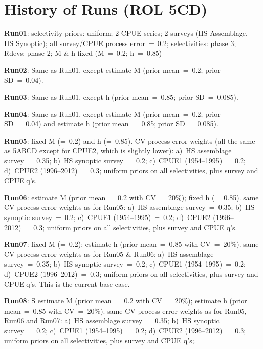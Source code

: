 
\section*{History of Runs (ROL 5CD)}

{\bf Run01}: selectivity priors: uniform; 2 CPUE series; 2 surveys (HS Assemblage, HS Synoptic); all survey/CPUE process error~=~0.2; selectivities: phase 3; Rdevs: phase 2; M \& h fixed (M~=~0.2; h~=~0.85) \newline  

{\bf Run02}: Same as Run01, except estimate M (prior mean~=~0.2; prior SD~=~0.04). \newline

{\bf Run03}: Same as Run01, except h (prior mean~=~0.85; prior SD~=~0.085). \newline

{\bf Run04}: Same as Run01,  except estimate M (prior mean~=~0.2; prior SD~=~0.04) and estimate h (prior mean~=~0.85; prior SD~=~0.085). \newline

{\bf Run05}: fixed M (=~0.2) and h (=~0.85).  CV process error weights (all the same as 5ABCD except for CPUE2, which is slightly lower): a)~HS assemblage survey~=~0.35; b)~HS synoptic survey~=~0.2; c)~CPUE1 (1954--1995)~=~0.2; d)~CPUE2 (1996--2012)~=~0.3; uniform priors on all selectivities, plus survey and CPUE q's. \newline

{\bf Run06}: estimate M (prior mean~=~0.2 with CV~=~20\%); fixed h (=~0.85).  same CV process error weights as for Run05: a)~HS assemblage survey~=~0.35; b)~HS synoptic survey~=~0.2; c)~CPUE1 (1954--1995)~=~0.2; d)~CPUE2 (1996--2012)~=~0.3; uniform priors on all selectivities, plus survey and CPUE q's. \newline

{\bf Run07}: fixed M (=~0.2); estimate h (prior mean~=~0.85 with CV~=~20\%).  same CV process error weights as for Run05 \& Run06: a)~HS assemblage survey~=~0.35; b)~HS synoptic survey~=~0.2; c)~CPUE1 (1954--1995)~=~0.2; d)~CPUE2 (1996--2012)~=~0.3; uniform priors on all selectivities, plus survey and CPUE q's.  This is the current base case. \newline

{\bf Run08}: S estimate M (prior mean~=~0.2 with CV~=~20\%); estimate h (prior mean~=~0.85 with CV~=~20\%).  same CV process error weights as for Run05, Run06 and Run07: a)~HS assemblage survey~=~0.35; b)~HS synoptic survey~=~0.2; c)~CPUE1 (1954--1995)~=~0.2; d)~CPUE2 (1996--2012)~=~0.3; uniform priors on all selectivities, plus survey and CPUE q's;. \newline

